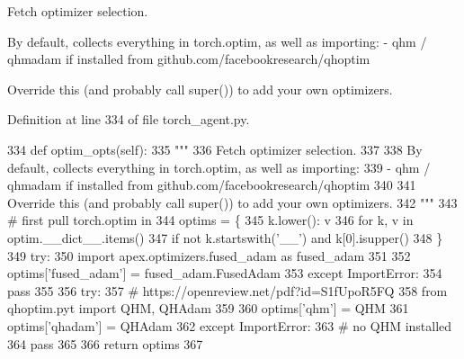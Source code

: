 \begin{DoxyVerb}Fetch optimizer selection.

By default, collects everything in torch.optim, as well as importing:
- qhm / qhmadam if installed from github.com/facebookresearch/qhoptim

Override this (and probably call super()) to add your own optimizers.
\end{DoxyVerb}
 

Definition at line 334 of file torch\+\_\+agent.\+py.


\begin{DoxyCode}
334     \textcolor{keyword}{def }optim\_opts(self):
335         \textcolor{stringliteral}{"""}
336 \textcolor{stringliteral}{        Fetch optimizer selection.}
337 \textcolor{stringliteral}{}
338 \textcolor{stringliteral}{        By default, collects everything in torch.optim, as well as importing:}
339 \textcolor{stringliteral}{        - qhm / qhmadam if installed from github.com/facebookresearch/qhoptim}
340 \textcolor{stringliteral}{}
341 \textcolor{stringliteral}{        Override this (and probably call super()) to add your own optimizers.}
342 \textcolor{stringliteral}{        """}
343         \textcolor{comment}{# first pull torch.optim in}
344         optims = \{
345             k.lower(): v
346             \textcolor{keywordflow}{for} k, v \textcolor{keywordflow}{in} optim.\_\_dict\_\_.items()
347             \textcolor{keywordflow}{if} \textcolor{keywordflow}{not} k.startswith(\textcolor{stringliteral}{'\_\_'}) \textcolor{keywordflow}{and} k[0].isupper()
348         \}
349         \textcolor{keywordflow}{try}:
350             \textcolor{keyword}{import} apex.optimizers.fused\_adam \textcolor{keyword}{as} fused\_adam
351 
352             optims[\textcolor{stringliteral}{'fused\_adam'}] = fused\_adam.FusedAdam
353         \textcolor{keywordflow}{except} ImportError:
354             \textcolor{keywordflow}{pass}
355 
356         \textcolor{keywordflow}{try}:
357             \textcolor{comment}{# https://openreview.net/pdf?id=S1fUpoR5FQ}
358             \textcolor{keyword}{from} qhoptim.pyt \textcolor{keyword}{import} QHM, QHAdam
359 
360             optims[\textcolor{stringliteral}{'qhm'}] = QHM
361             optims[\textcolor{stringliteral}{'qhadam'}] = QHAdam
362         \textcolor{keywordflow}{except} ImportError:
363             \textcolor{comment}{# no QHM installed}
364             \textcolor{keywordflow}{pass}
365 
366         \textcolor{keywordflow}{return} optims
367 
\end{DoxyCode}
\mbox{\label{classparlai_1_1core_1_1torch__agent_1_1TorchAgent_a02beaaedfa30463f9d0a97ea590b516f}} 
